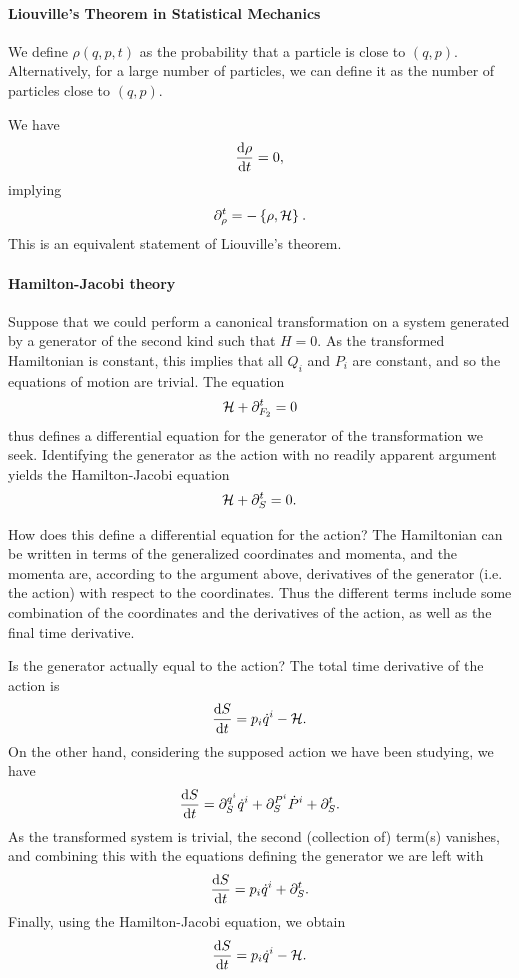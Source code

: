 \paragraph{Liouville's Theorem in Statistical Mechanics}
We define $\rho(q, p, t)$ as the probability that a particle is close to $(q, p)$. Alternatively, for a large number of particles, we can define it as the number of particles close to $(q, p)$.

We have
\begin{align*}
	\dv{\rho}{t} = 0,
\end{align*}
implying
\begin{align*}
	\partial^{t}_{\rho} = -\left\{\rho, \mathcal{H}\right\}_{}.
\end{align*}
This is an equivalent statement of Liouville's theorem.

\paragraph{Hamilton-Jacobi theory}
Suppose that we could perform a canonical transformation on a system generated by a generator of the second kind such that $H = 0$. As the transformed Hamiltonian is constant, this implies that all $Q_{i}$ and $P_{i}$ are constant, and so the equations of motion are trivial. The equation
\begin{align*}
	\mathcal{H} + \partial^{t}_{F_{2}} = 0
\end{align*}
thus defines a differential equation for the generator of the transformation we seek. Identifying the generator as the action with no readily apparent argument yields the Hamilton-Jacobi equation
\begin{align*}
	\mathcal{H} + \partial^{t}_{S} = 0.
\end{align*}

How does this define a differential equation for the action? The Hamiltonian can be written in terms of the generalized coordinates and momenta, and the momenta are, according to the argument above, derivatives of the generator (i.e. the action) with respect to the coordinates. Thus the different terms include some combination of the coordinates and the derivatives of the action, as well as the final time derivative.

Is the generator actually equal to the action? The total time derivative of the action is
\begin{align*}
	\dv{S}{t} = p_{i}\dot{q}^{i} - \mathcal{H}.
\end{align*}
On the other hand, considering the supposed action we have been studying, we have
\begin{align*}
	\dv{S}{t} = \partial^{q^{i}}_{S}\dot{q}^{i} + \partial^{P^{i}}_{S}\dot{P}^{i} + \partial^{t}_{S}.
\end{align*}
As the transformed system is trivial, the second (collection of) term(s) vanishes, and combining this with the equations defining the generator we are left with
\begin{align*}
	\dv{S}{t} = p_{i}\dot{q}^{i} + \partial^{t}_{S}.
\end{align*}
Finally, using the Hamilton-Jacobi equation, we obtain
\begin{align*}
	\dv{S}{t} = p_{i}\dot{q}^{i} - \mathcal{H}.
\end{align*}

